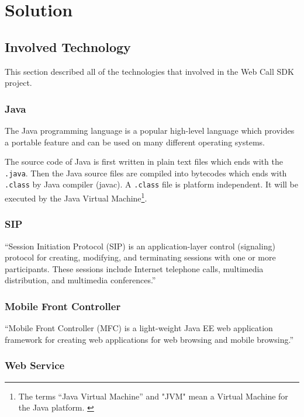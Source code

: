 \chapter{Solution}
\label{sec:Solution}

\section{Involved Technology}
\label{sec:Solution:InvolvedTechnology}

This section described all of the technologies that involved in the Web Call SDK project.

\subsection{Java}
\label{sec:Solution:InvolvedTechnology:Java}

The Java\texttrademark{} programming language is a popular high-level language which provides a portable feature and can be used on many different operating systems. 

The source code of Java is first written in plain text files which ends with the \nolinebreak\texttt{.java}. Then the Java source files are compiled into bytecodes which ends with \nolinebreak\texttt{.class} by Java compiler (javac). A \nolinebreak\texttt{.class} file is platform independent. It will be executed by the Java Virtual Machine\label{sym:JVM}\footnote{The terms ``Java Virtual Machine'' and "JVM" mean a Virtual Machine for the Java platform. \cite{TheJavaProgrammingLanguage}}.\cite{TheJavaProgrammingLanguage}

\subsection{SIP}
\label{sec:Solution:InvolvedTechnology:SIP}

``Session Initiation Protocol (SIP\label{sym:SIP}) is an application-layer control (signaling) protocol for creating, modifying, and terminating sessions with one or more participants. These sessions include Internet telephone calls, multimedia distribution, and multimedia conferences.''\cite{RFC3261}

\subsection{Mobile Front Controller}
\label{sec:Solution:InovlvedTechnology:MobileFrontController}

``Mobile Front Controller (MFC) is a light-weight Java EE web application framework for creating web applications for web browsing and mobile browsing.''\cite{MobileFrontController}


\subsection{Web Service}
\label{sec:Solution:InovlvedTechnology:WebService}











